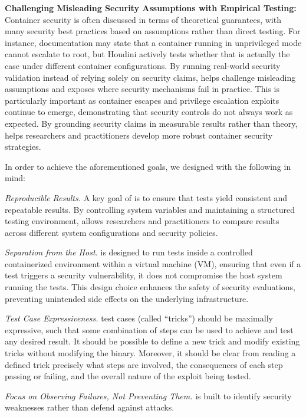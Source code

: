 \textbf{Challenging Misleading Security Assumptions with Empirical Testing:}
Container security is often discussed in terms of theoretical guarantees, with many security best practices based on assumptions rather than direct testing. For instance, documentation may state that a container running in unprivileged mode cannot escalate to root, but Houdini actively tests whether that is actually the case under different container configurations. By running real-world security validation instead of relying solely on security claims, \houdini helps challenge misleading assumptions and exposes where security mechanisms fail in practice. This is particularly important as container escapes and privilege escalation exploits continue to emerge, demonstrating that security controls do not always work as expected. By grounding security claims in measurable results rather than theory, \houdini helps researchers and practitioners develop more robust container security strategies.


In order to achieve the aforementioned goals, we designed \houdini with the following in mind:

\begin{dgenum}
  \item \label{dg:repro}\textit{Reproducible Results.} A key goal of \houdini is to ensure that tests yield consistent and repeatable results. By controlling system variables and maintaining a structured testing environment, \houdini allows researchers and practitioners to compare results across different system configurations and security policies.

  \item \label{dg:container}\textit{Separation from the Host.} \houdini is designed to run tests inside a controlled containerized environment within a virtual machine (VM), ensuring that even if a test triggers a security vulnerability, it does not compromise the host system running the tests. This design choice enhances the safety of security evaluations, preventing unintended side effects on the underlying infrastructure.

  \item \label{dg:test}\textit{Test Case Expressiveness.} \houdini test cases (called \enquote{tricks}) should be maximally expressive, such that some combination of steps can be used to achieve and test any desired result. It should be possible to define a new \houdini trick and modify existing tricks without modifying the \houdini binary. Moreover, it should be clear from reading a defined trick precisely what steps are involved, the consequences of each step passing or failing, and the overall nature of the exploit being tested.

  \item \label{dg:failures}\textit{Focus on Observing Failures, Not Preventing Them.} \houdini is built to identify security weaknesses rather than defend against attacks.
\end{dgenum}

